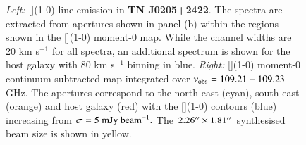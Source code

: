 \begin{figure}
\hspace*{-50pt}
\centering
{}
  \caption[{TN J0205+2422 [](1-0) line spectra and moment-0 maps}]{{\it Left:} [](1-0) line emission in {\bf TN J0205+2422}. The spectra are extracted from apertures shown in panel (b) within the regions shown in the [](1-0) moment-0 map. While the channel widths are 20 km s$^{-1}$ for all spectra, an additional spectrum is shown for the host galaxy with 80 km s$^{-1}$ binning in blue. {\it Right:}  [](1-0) moment-0 continuum-subtracted map integrated over $\nu_{\rm obs}=109.21-109.23$ GHz. The apertures correspond to the north-east (cyan), south-east (orange) and host galaxy (red) with the [](1-0) contours (blue) increasing from $\sigma=5~\rm{mJy~beam}^{-1}.$ The $2.26^{\prime\prime} \times 1.81^{\prime\prime}$ synthesised beam size is shown in yellow.}
  \label{fig:TNJ0205-fit-CI-moment0}
\end{figure}

